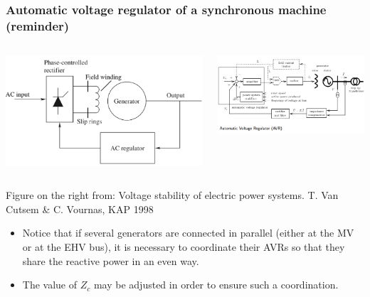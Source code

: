 \begin{frame}
    \frametitle{Automatic voltage regulator of a synchronous machine (reminder)}
    \begin{columns}
        \begin{column}{0.35\textwidth}
            \includegraphics[width=\textwidth]{images/exciter.png}
        \end{column}
        \begin{column}{0.6\textwidth}
            \includegraphics[width=\textwidth]{images/avr.png}
        \end{column}
    \end{columns}
    \tiny{Figure on the right from: Voltage stability of electric power systems. T. Van Cutsem \& C. Vournas, KAP 1998}
    \begin{itemize}
        \item Notice that if several generators are connected in parallel (either at the MV or at the EHV bus), it is necessary to coordinate their AVRs so that they share the reactive power in an even way.
        \item The value of $Z_c$ may be adjusted in order to ensure such a coordination.
    \end{itemize}
\end{frame}

